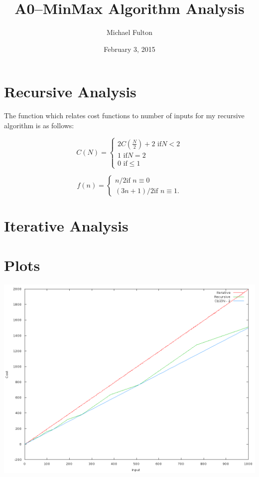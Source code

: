 \documentclass{article}
\begin{document}
\title{A0--MinMax Algorithm Analysis}
\author{Michael Fulton}
\date{February 3, 2015}

\maketitle

\section{Recursive Analysis}

	The function which relates cost functions to number of inputs for my recursive algorithm is as follows:

\[
	C(N)=
	\begin{cases}
		2C(\frac{N}{2})+2 \mbox{ if} N < 2 \\
		1 \mbox{ if}   N = 2 \\
		0 \mbox{ if} \leq 1 
	\end{cases}
\]


\[f(n) = \begin{cases} n/2 \mbox{if } n \equiv 0 \\ 
(3n +1)/2  \mbox{if } n \equiv 1. \end{cases}\]

	
\section{Iterative Analysis}

\newpage
\section{Plots}
\includegraphics[scale =0.6]{plot.png}
\centering
\end{document}
